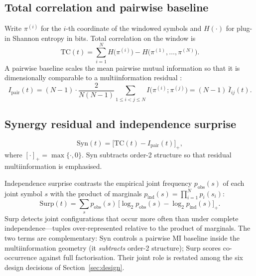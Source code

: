 \documentclass[11pt,a4paper]{article}
\begin{document}
\subsection{Total correlation and pairwise baseline}
\label{sec:tc}

Write $\pi^{(i)}$ for the $i$-th coordinate of the windowed symbols and
$H(\cdot)$ for plug-in Shannon entropy in bits. Total correlation on the
window is
\begin{equation}
\label{eq:tc}
\mathrm{TC}(t)
=\sum_{i=1}^{N} H\bigl(\pi^{(i)}\bigr)
-H\bigl(\pi^{(1)},\ldots,\pi^{(N)}\bigr).
\end{equation}
A pairwise baseline scales the mean pairwise mutual information so that it
is dimensionally comparable to a multiinformation residual
\citep{Padilla2026framework}:
\begin{equation}
\label{eq:ipair}
I_{\mathrm{pair}}(t)
=(N-1)\cdot
\frac{2}{N(N-1)}
\sum_{1\le i<j\le N}
I\bigl(\pi^{(i)};\pi^{(j)}\bigr)
=(N-1)\,\overline{I}_{ij}(t).
\end{equation}

\subsection{Synergy residual and independence surprise}
\label{sec:syn_surp}

\begin{equation}
\label{eq:syn}
\mathrm{Syn}(t)
=\bigl[\mathrm{TC}(t)-I_{\mathrm{pair}}(t)\bigr]_+ ,
\end{equation}
where $[\cdot]_+=\max\{\cdot,0\}$. $\mathrm{Syn}$ subtracts order-2 structure
so that residual multiinformation is emphasised.

Independence surprise contrasts the empirical joint frequency
$p_{\mathrm{obs}}(s)$ of each joint symbol $s$ with the product of marginals
$p_{\mathrm{ind}}(s)=\prod_{i=1}^{N}p_i(s_i)$:
\begin{equation}
\label{eq:surp}
\mathrm{Surp}(t)
=\sum_{s} p_{\mathrm{obs}}(s)\,
\bigl[\log_2 p_{\mathrm{obs}}(s)-\log_2 p_{\mathrm{ind}}(s)\bigr]_+ .
\end{equation}
$\mathrm{Surp}$ detects joint configurations that occur more often than under
complete independence---tuples over-represented relative to the product of
marginals. The two terms are complementary: $\mathrm{Syn}$ controls a
pairwise MI baseline inside the multiinformation geometry (it
\emph{subtracts} order-2 structure); $\mathrm{Surp}$ scores co-occurrence
against full factorisation. Their joint role is restated among the six
design decisions of Section~\ref{sec:design}.
\end{document}
